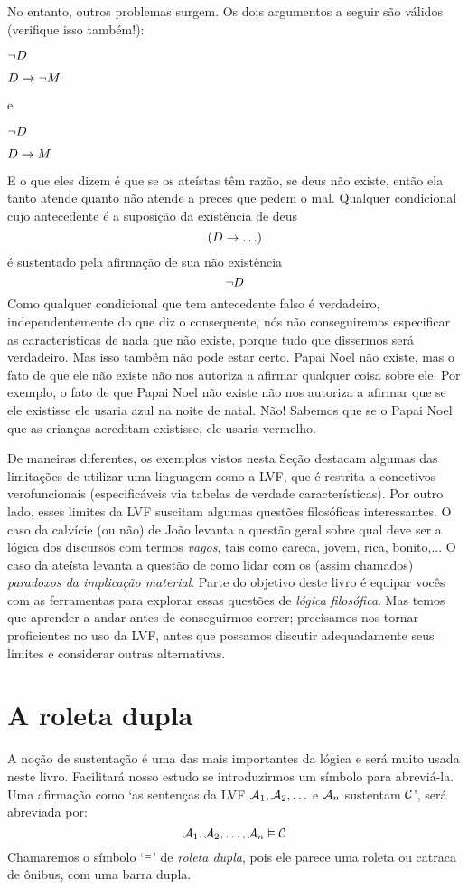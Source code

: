 No entanto, outros problemas surgem.
Os dois argumentos a seguir são válidos (verifique isso também!):
	\begin{earg}
		\item[] $\neg D$
		\item[\therefore] $D \rightarrow \neg M$
	\end{earg}
e
	\begin{earg}
		\item[] $\neg D$
		\item[\therefore] $D \rightarrow M$
	\end{earg}
E o que eles dizem é que se os ateístas têm razão, se deus não existe, então ela tanto atende quanto não atende a preces que pedem o mal.
Qualquer condicional cujo antecedente é a suposição da existência de deus
$$(D \rightarrow \ldots)$$
é sustentado pela afirmação de sua não existência
$$\neg D$$
Como qualquer condicional que tem antecedente falso é verdadeiro, independentemente do que diz o consequente,
nós não conseguiremos especificar as características de nada que não existe, porque tudo que dissermos será verdadeiro.
Mas isso também não pode estar certo.
Papai Noel não existe, mas o fato de que ele não existe não nos autoriza a afirmar qualquer coisa sobre ele.
Por exemplo, o fato de que Papai Noel não existe não nos autoriza a afirmar que se ele existisse ele usaria azul na noite de natal.
Não!
Sabemos que se o Papai Noel que as crianças acreditam existisse, ele usaria vermelho.
                
De maneiras diferentes, os exemplos vistos nesta Seção destacam algumas das limitações de utilizar uma linguagem como a LVF, que é restrita a conectivos verofuncionais (especificáveis via tabelas de verdade características).
Por outro lado, esses limites da LVF suscitam algumas questões filosóficas interessantes.
O caso da calvície (ou não) de João levanta a questão geral sobre qual deve ser a lógica dos discursos com termos \emph{vagos}, tais como careca, jovem, rica, bonito,... 
O caso da ateísta levanta a questão de como lidar com os (assim chamados) \emph{paradoxos da implicação material}.
Parte do objetivo deste livro é equipar vocês com as ferramentas para explorar essas questões de \emph{lógica filosófica}.
Mas temos que aprender a andar antes de conseguirmos correr; precisamos nos tornar proficientes no uso da LVF, antes que possamos discutir adequadamente seus limites e considerar outras alternativas.


\section{A roleta dupla}
A noção de sustentação é uma das mais importantes da lógica e será muito usada neste livro.
Facilitará nosso estudo se introduzirmos um símbolo para abreviá-la.
Uma afirmação como `as sentenças da LVF $\mathcal{A}_1, \mathcal{A}_2, \ldots$ e $\mathcal{A}_n$ sustentam $\mathcal{C}$', será abreviada por:
	$$\mathcal{A}_1, \mathcal{A}_2, \ldots, \mathcal{A}_n \vDash \mathcal{C}$$
Chamaremos o símbolo `$\vDash$' de \emph{roleta dupla}, pois ele parece uma roleta ou catraca de ônibus, com uma barra dupla.

